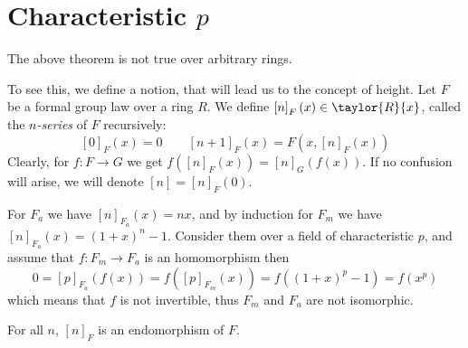 \section{Characteristic $p$}

\begin{remark*}
	The above theorem is not true over arbitrary rings.
	
	To see this, we define a notion, that will lead us to the concept of height.
	Let $F$ be a formal group law over a ring $R$. We define $\left[n\right]_F \left(x\right) \in \taylor{R}{x}$, called the \emph{$n$-series} of $F$ recursively:
	$$
		\left[0\right]_F \left(x\right) = 0
		\qquad
		\left[n+1\right]_F \left(x\right) = F\left(x, \left[n\right]_F \left(x\right)\right)
	$$
	Clearly, for $f: F \to G$ we get
	$
		f\left(\left[n\right]_F \left(x\right)\right)
		=
		\left[n\right]_G \left(f\left(x\right)\right)
	$.
	If no confusion will arise, we will denote $\left[n\right] = \left[n\right]_F\left(0\right)$.
	
	For $F_a$ we have $\left[n\right]_{F_a} \left(x\right) = nx$,
	and by induction for $F_m$ we have $\left[n\right]_{F_a} \left(x\right) = \left(1+x\right)^n - 1$.
	Consider them over a field of characteristic $p$, and assume that $f: F_m \to F_a$ is an homomorphism then
	$$
		0
		=
		\left[p\right]_{F_a} \left(f\left(x\right)\right)
		=
		f\left(\left[p\right]_{F_m} \left(x\right)\right)
		=
		f\left(\left(1+x\right)^p-1\right)
		=
		f\left(x^p\right)
	$$
	which means that $f$ is not invertible, thus $F_m$ and $F_a$ are not isomorphic.
\end{remark*}

\begin{claim*}
	For all $n$, $\left[n\right]_F$ is an endomorphism of $F$.
\end{claim*}

